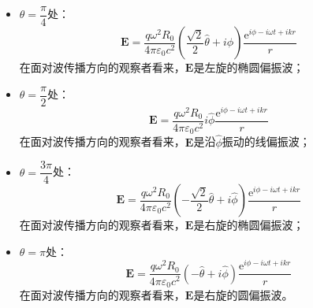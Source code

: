 \documentclass[a4paper,fontset=none]{ctexart}
\begin{document}
\begin{itemize}
\begin{itemize}
        \item[\bullet] $\theta=\dfrac{\pi}{4}$处：
        \[
             \bm{E} = \frac{q\omega^2R_0}{4\pi\varepsilon_0c^2}\left(\frac{\sqrt{2}}{2}\hat{\theta} + i\hat{\phi}\right)\frac{\mathrm{e}^{i\phi-i\omega t+ikr}}{r}
        \]
        在面对波传播方向的观察者看来，$\bm{E}$是左旋的椭圆偏振波；

        \item[\bullet] $\theta=\dfrac{\pi}{2}$处：
        \[
             \bm{E} = \frac{q\omega^2R_0}{4\pi\varepsilon_0c^2}i\hat{\phi}\frac{\mathrm{e}^{i\phi-i\omega t+ikr}}{r}
        \]
        在面对波传播方向的观察者看来，$\bm{E}$是沿$\hat{\phi}$振动的线偏振波；

        \item[\bullet] $\theta=\dfrac{3\pi}{4}$处：
        \[
             \bm{E} = \frac{q\omega^2R_0}{4\pi\varepsilon_0c^2}\left(-\frac{\sqrt{2}}{2}\hat{\theta} + i\hat{\phi}\right)\frac{\mathrm{e}^{i\phi-i\omega t+ikr}}{r}
        \]
        在面对波传播方向的观察者看来，$\bm{E}$是右旋的椭圆偏振波；

        \item[\bullet] $\theta=\pi$处：
        \[
             \bm{E} = \frac{q\omega^2R_0}{4\pi\varepsilon_0c^2}(-\hat{\theta} + i\hat{\phi})\frac{\mathrm{e}^{i\phi-i\omega t+ikr}}{r}
        \]
        在面对波传播方向的观察者看来，$\bm{E}$是右旋的圆偏振波。
    \end{itemize}


\end{itemize}
\end{document}
